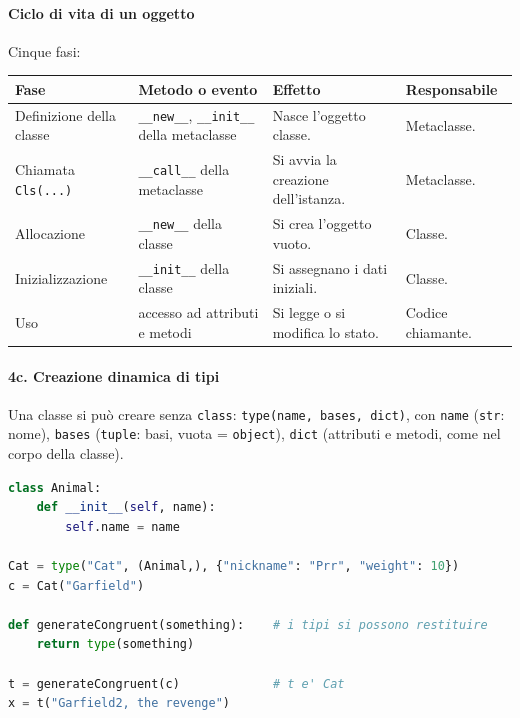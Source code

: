 \documentclass[12pt]{extarticle}
\begin{document}
\paragraph{Ciclo di vita di un oggetto} Cinque fasi:
\begin{center}
\small
\begin{tabular}{p{3.4cm}p{4.0cm}p{4.2cm}p{3.0cm}}
    \toprule
    \textbf{Fase} & \textbf{Metodo o evento} & \textbf{Effetto} & \textbf{Responsabile} \\
    \midrule
    Definizione della classe & \texttt{\_\_new\_\_}, \texttt{\_\_init\_\_} della metaclasse & Nasce l'oggetto classe. & Metaclasse. \\
    \addlinespace
    Chiamata \texttt{Cls(...)} & \texttt{\_\_call\_\_} della metaclasse & Si avvia la creazione dell'istanza. & Metaclasse. \\
    \addlinespace
    Allocazione & \texttt{\_\_new\_\_} della classe & Si crea l'oggetto vuoto. & Classe. \\
    \addlinespace
    Inizializzazione & \texttt{\_\_init\_\_} della classe & Si assegnano i dati iniziali. & Classe. \\
    \addlinespace
    Uso & accesso ad attributi e metodi & Si legge o si modifica lo stato. & Codice chiamante. \\
    \bottomrule
\end{tabular}
\end{center}

\paragraph{4c. Creazione dinamica di tipi} Una classe si può creare senza \texttt{class}: \texttt{type(name, bases, dict)}, con \texttt{name} (\texttt{str}: nome), \texttt{bases} (\texttt{tuple}: basi, vuota = \texttt{object}), \texttt{dict} (attributi e metodi, come nel corpo della classe).
\begin{lstlisting}[language=Python]
class Animal:
    def __init__(self, name):
        self.name = name

Cat = type("Cat", (Animal,), {"nickname": "Prr", "weight": 10})
c = Cat("Garfield")

def generateCongruent(something):    # i tipi si possono restituire
    return type(something)

t = generateCongruent(c)             # t e' Cat
x = t("Garfield2, the revenge")
\end{lstlisting}
\end{document}
